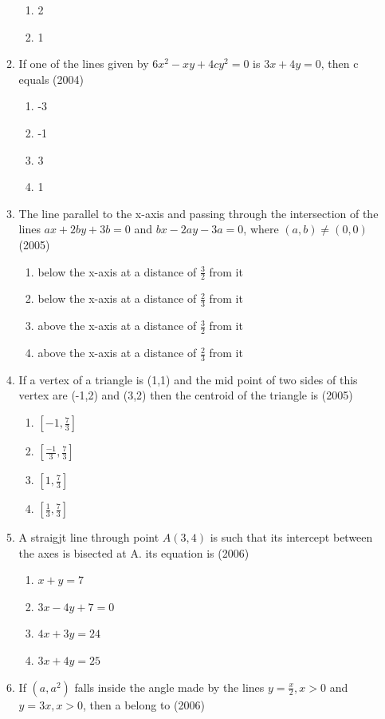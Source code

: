 \documentclass[12pt]{article}
\providecommand{\sbrak}[1]{\ensuremath{{}\left[#1\right]}}
\begin{document}
\begin{enumerate}
\begin{enumerate}
\begin{enumerate}
\item  2 
\item  1
\end{enumerate}
\item If one of the lines given by $6x^2-xy+4cy^2=0$ is $3x+4y=0$, then c equals (2004)
\begin{enumerate}
\item -3 
\item -1 
\item  3 
\item  1
\end{enumerate}
\item The line parallel to the x-axis and passing through the intersection of the lines $ax+2by+3b=0$ and $bx-2ay-3a=0$, where $(a,b) \neq (0,0)$ (2005)
\begin{enumerate}
\item below the x-axis at a distance of $\frac{3}{2}$ from it
\item below the x-axis at a distance of $\frac{2}{3}$ from it
\item above the x-axis at a distance of $\frac{3}{2}$ from it
\item above the x-axis at a distance of $\frac{2}{3}$ from it
\end{enumerate}
\item If a vertex of a triangle is (1,1) and the mid point of two sides of this vertex are (-1,2) and (3,2) then the centroid of the triangle is (2005)
\begin{enumerate}
\item $\sbrak{-1,\frac{7}{3}}$ 
\item $\sbrak{\frac{-1}{3},\frac{7}{3}}$ 
\item $\sbrak{1,\frac{7}{3}}$  
\item $\sbrak{\frac{1}{3},\frac{7}{3}}$ 
\end{enumerate}
\item A straigjt line through point $A(3,4)$ is such that its intercept between the axes is bisected at A. its equation is (2006)
\begin{enumerate}
\item $x+y=7$ 
\item $3x-4y+7=0$  
\item $4x+3y=24$ 
\item $3x+4y=25$
\end{enumerate}
\item If $(a,a^2)$ falls inside the angle made by the lines $y= \frac{x}{2}, x>0$ and $y=3x, x>0$, then a belong to (2006)

\end{enumerate}
\end{enumerate}
\end{document}
